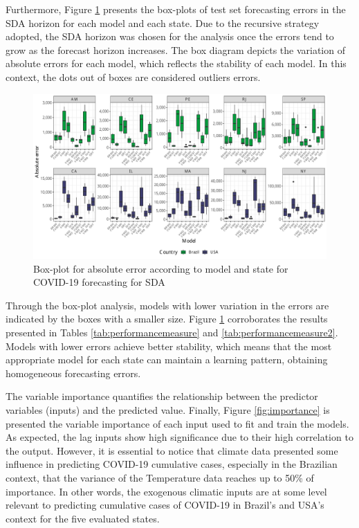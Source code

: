 Furthermore, Figure \ref{fig:error} presents the box-plots of test set forecasting errors in the \ac{SDA} horizon for each model and each state. Due to the recursive strategy adopted, the \ac{SDA} horizon was chosen for the analysis once the errors tend to grow as the forecast horizon increases. The box diagram depicts the variation of absolute errors for each model, which reflects the stability of each model. In this context, the dots out of boxes are considered outliers errors.

\begin{figure}[htb!]
    \centering
    \includegraphics[width=\linewidth]{Media/cs1_error.pdf}
    \caption{Box-plot for absolute error according to model and state for COVID-19 forecasting for SDA}
    \label{fig:error}
\end{figure}

Through the box-plot analysis, models with lower variation in the errors are indicated by the boxes with a smaller size. Figure \ref{fig:error} corroborates the results presented in Tables \ref{tab:performancemeasure} and \ref{tab:performancemeasure2}. Models with lower errors achieve better stability, which means that the most appropriate model for each state can maintain a learning pattern, obtaining homogeneous forecasting errors.

The variable importance quantifies the relationship between the predictor variables (inputs) and the predicted value. Finally, Figure \ref{fig:importance} is presented the variable importance of each input used to fit and train the models. As expected, the lag inputs show high significance due to their high correlation to the output. However, it is essential to notice that climate data presented some influence in predicting \ac{COVID-19} cumulative cases, especially in the Brazilian context, that the variance of the Temperature data reaches up to 50\% of importance. In other words, the exogenous climatic inputs are at some level relevant to predicting cumulative cases of \ac{COVID-19} in Brazil's and \ac{USA}'s context for the five evaluated states.


